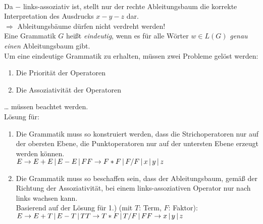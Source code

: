 \\
Da $-$ links-assoziativ ist, stellt nur der rechte Ableitungsbaum die korrekte Interpretation des Ausdrucks $x-y-z$ dar.\\
$\Rightarrow$ Ableitungsbäume dürfen nicht verdreht werden!\\
Eine Grammatik $G$ heißt \emph{eindeutig}, wenn es für alle Wörter $w \in L(G)$ \emph{genau einen} Ableitungsbaum gibt.\\
Um eine eindeutige Grammatik zu erhalten, müssen zwei Probleme gelöst werden:
\begin{enumerate}
\item Die Priorität der Operatoren
\item Die Assoziativität der Operatoren
\end{enumerate}
… müssen beachtet werden.\\
Lösung für:
\begin{enumerate}
\item Die Grammatik muss so konstruiert werden, dass die Strichoperatoren nur auf der obersten Ebene, die Punktoperatoren nur auf der untersten Ebene erzeugt werden können.\\
$E\to E+E \,|\, E-E \,|\, F \\
F \to F*F \,|\, F/F \,|\, x \,|\, y \,|\, z$
\item Die Grammatik muss so beschaffen sein, dass der Ableitungsbaum, gemäß der Richtung der Assoziativität, bei einem links-assoziativen Operator nur nach links wachsen kann.\\
Basierend auf der Lösung für 1.) (mit $T$: Term, $F$: Faktor):\\
$E\to E+T \,|\, E-T \,|\, T \\
T \to T*F \,|\, T/F \,|\, F\\
F \to x \,|\, y \,|\, z$
\end{enumerate}
